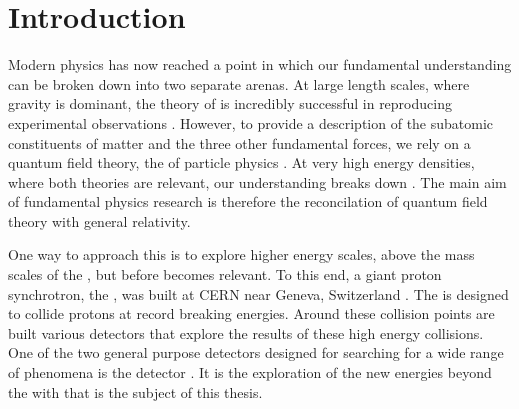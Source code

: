 \chapter{Introduction}
\label{chap:introduction}





Modern physics has now reached a point in which our fundamental
understanding can be broken down into two separate arenas. At large
length scales, where gravity is dominant, the theory of \GR
\cite{1914ZMP63215E} is incredibly successful in reproducing
experimental observations \cite{Will:2014kxa}.  However, to provide a
description of the subatomic constituents of matter and the three
other fundamental forces, we rely on a quantum field theory, the \SM
of particle physics
\cite{Salam:1964ry,Glashow:1961tr,PhysRevLett.19.1264}. At very high
energy densities, where both theories are relevant, our understanding
breaks down \cite{Weinberg:1980gg}. The main aim of fundamental
physics research is therefore the reconcilation of quantum field
theory with general relativity. 

One way to approach this is to explore higher energy scales, above the
mass scales of the \SM, but before \GR becomes relevant. To this end, a
giant proton synchrotron, the \LHC, was built at CERN near Geneva,
Switzerland \cite{Evans:2008zzb}. The \LHC is designed to collide
protons at record breaking energies. Around these collision
points are built various detectors that explore the results of these
high energy collisions. One of the two general purpose detectors
designed for searching for a wide range of phenomena is the \CMS
detector \cite{Chatrchyan:2008aa}. It is the exploration of the new
energies beyond the \SM with \CMS that is the subject of this thesis.

